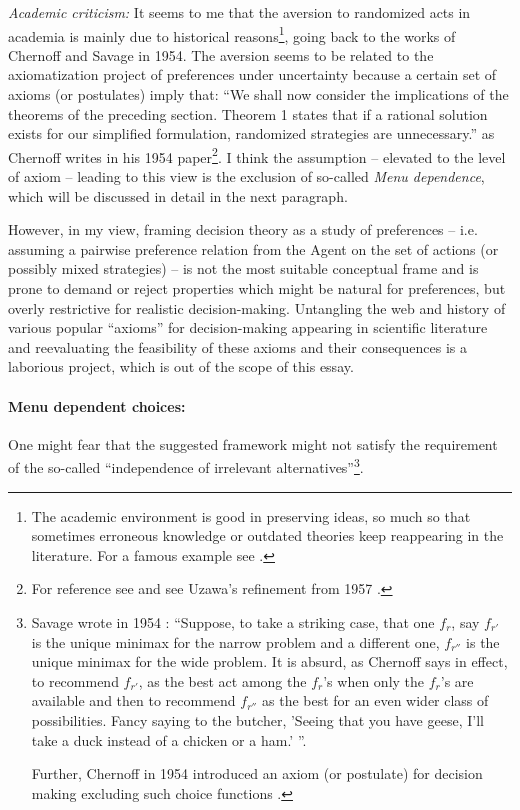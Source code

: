 \documentclass{article}
\begin{document}
{\it Academic criticism:}
It seems to me that the aversion to randomized acts in academia is mainly due to historical reasons\footnote{The academic environment is good in preserving ideas, so much so that sometimes erroneous knowledge or outdated theories keep reappearing in the literature. For a famous example see \cite{blog:ElectronCharge,speach:FeynmanCargoCultScience}.}, going back to the works of Chernoff and Savage in 1954.
The aversion seems to be related to the axiomatization project of preferences under uncertainty because a certain set of axioms (or postulates) imply that: ``We shall now consider the implications of the theorems of the preceding section. Theorem 1 states that if a rational solution exists for our simplified formulation, randomized strategies are unnecessary.'' as Chernoff writes in his 1954 paper\footnote{For reference see \cite{paper:Chernoff1954} and see Uzawa's refinement from 1957 \cite{paper:Uzawa1957}.}. 
I think the assumption -- elevated to the level of axiom -- leading to this view is the exclusion of so-called \emph{Menu dependence}, which will be discussed in detail in the next paragraph. 

However, in my view, framing decision theory as a study of preferences -- i.e. assuming a pairwise preference relation from the Agent on the set of actions (or possibly mixed strategies) -- is not the most suitable conceptual frame and is prone to demand or reject properties which might be natural for preferences, but overly restrictive for realistic decision-making.
Untangling the web and history of various popular ``axioms'' for decision-making appearing in scientific literature and reevaluating the feasibility of these axioms and their consequences is a laborious project, which is out of the scope of this essay.

\paragraph{Menu dependent choices:}
One might fear that the suggested framework might not satisfy the requirement of the so-called ``independence of irrelevant alternatives''\footnote{Savage wrote in 1954 \cite{book:Savage}:
``Suppose, to take a striking case, that one $f_r$, say $f_{r'}$ is the unique minimax for the narrow problem and a different one, $f_{r''}$ is the unique minimax for the wide problem. It is absurd, as Chernoff says in effect, to recommend $f_{r'}$, as the best act among the $f_r$'s when only the $f_r$'s are available and then to recommend $f_{r''}$ as the best for an even wider class of possibilities. Fancy saying to the butcher, 'Seeing that you have geese, I'll take a duck instead of a chicken or a ham.' ''. 

Further, Chernoff in 1954 introduced an axiom (or postulate) for decision making excluding such choice functions \cite{paper:Chernoff1954}.}.
\end{document}
